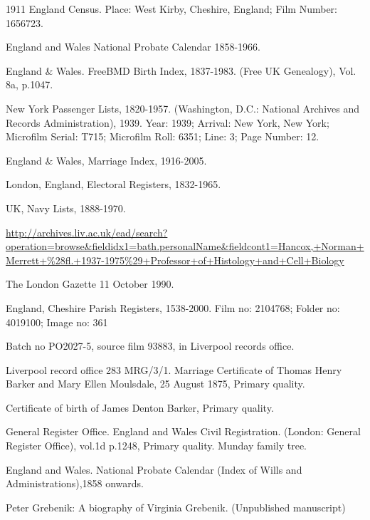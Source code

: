 \begin{thebibliography}{99}
	1911 England Census. Place: West Kirby, Cheshire, England; Film Number: 1656723.

	England and Wales National Probate Calendar 1858-1966.
	
	England \& Wales. FreeBMD Birth Index, 1837-1983. (Free UK Genealogy), Vol. 8a, p.1047. 
	
	New York Passenger Lists, 1820-1957. (Washington, D.C.: National Archives and Records Administration), 1939.
	Year: 1939; Arrival: New York, New York; Microfilm Serial: T715; Microfilm Roll: 6351; Line: 3; Page Number: 12.

	England \& Wales, Marriage Index, 1916-2005. 
	
	 London, England, Electoral Registers, 1832-1965. 
	 
	 UK, Navy Lists, 1888-1970.
	 
	\url{http://archives.liv.ac.uk/ead/search?operation=browse&fieldidx1=bath.personalName&fieldcont1=Hancox,+Norman+Merrett+\%28fl.+1937-1975\%29+Professor+of+Histology+and+Cell+Biology}

	The London Gazette 11 October 1990. 
	
	England, Cheshire Parish Registers, 1538-2000.
	Film no: 2104768; Folder no: 4019100; Image no: 361

	Batch no PO2027-5, source film 93883, in Liverpool records office.

	Liverpool record office 283 MRG/3/1.
	Marriage Certificate of Thomas Henry Barker and Mary Ellen Moulsdale, 25 August 1875, Primary quality. 
	
	Certificate of birth of James Denton Barker, Primary quality. 
	
	General Register Office. England and Wales Civil Registration. (London: General Register Office), vol.1d p.1248, Primary quality.
	Munday family tree. 
	
	England and Wales. National Probate Calendar (Index of Wills and Administrations),1858 onwards. 
	
	Peter Grebenik: A biography of Virginia Grebenik. (Unpublished manuscript)


\end{thebibliography}
